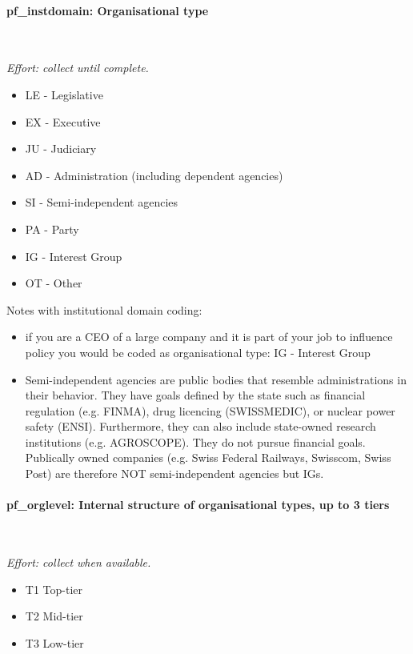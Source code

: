 \documentclass{article}
\begin{document}
    \paragraph{pf\_instdomain: Organisational type}\label{level2} \\
        \par\textit{Effort: collect until complete.}
      \begin{itemize}
        \item LE    - Legislative
        \item EX    - Executive
        \item JU    - Judiciary
        \item AD    - Administration (including dependent agencies)
        \item SI    - Semi-independent agencies
        \item PA    - Party
        \item IG    - Interest Group
        \item OT - Other
     \end{itemize}
    
    Notes with institutional domain coding:
    \begin{itemize}
        \item if you are a CEO of a large company and it is part of your job to influence policy you would be coded as organisational type: IG - Interest Group
        \item Semi-independent agencies are public bodies that resemble administrations in their behavior. They have goals defined by the state such as financial regulation (e.g. FINMA), drug licencing (SWISSMEDIC), or nuclear power safety (ENSI). Furthermore, they can also include state-owned research institutions (e.g. AGROSCOPE). They do not pursue financial goals. Publically owned companies (e.g. Swiss Federal Railways, Swisscom, Swiss Post) are therefore NOT semi-independent agencies but IGs.
    \end{itemize}
    
   \paragraph{pf\_orglevel: Internal structure of organisational types, up to 3 tiers}\label{level3} \\
             \par\textit{Effort: collect when available.}
      \begin{itemize}
        \item T1 Top-tier
        \item T2 Mid-tier
        \item T3 Low-tier
     \end{itemize}
\end{document}
